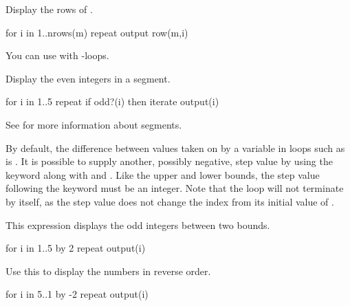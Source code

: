 {\begin{xtc}
\begin{xtccomment}
Display the rows of .
\end{xtccomment}
\begin{spadsrc}
for i in 1..nrows(m) repeat output row(m,i) 
\end{spadsrc}
\end{xtc}
%
You can use  with -loops.
\begin{xtc}
\begin{xtccomment}
Display the even integers in a segment.
\end{xtccomment}
\begin{spadsrc}
for i in 1..5 repeat
  if odd?(i) then iterate
  output(i)
\end{spadsrc}
\end{xtc}

See  for more information about segments.


By default, the difference between values taken on by a variable in loops
such as  is .
It is possible to supply another, possibly negative, step value by using
the 
keyword along with  and .
Like the upper and lower bounds, the step value following the
 keyword must be an integer.
Note that the loop
will not terminate by itself, as the step value does not change the index
from its initial value of .

\begin{xtc}
\begin{xtccomment}
This expression displays the odd integers between two bounds.
\end{xtccomment}
\begin{spadsrc}
for i in 1..5 by 2 repeat output(i)
\end{spadsrc}
\end{xtc}
\begin{xtc}
\begin{xtccomment}
Use this to display the numbers in reverse order.
\end{xtccomment}
\begin{spadsrc}
for i in 5..1 by -2 repeat output(i)
\end{spadsrc}
\end{xtc}

}
